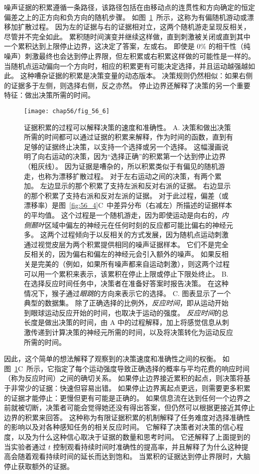 噪声证据的积累遵循一条路径，该路径包括在由移动点的连贯性和方向确定的恒定偏差之上的正方向和负方向的随机步骤。
如图~\ref{fig:56_6}~所示，这称为有偏随机游动或漂移加扩散过程。
因为左的证据与右的证据相对立，这两个随机游走呈现反相关，尽管并不完全如此。
累积随时间演变并继续这样做，直到刺激被关闭或直到其中一个累积达到上限停止边界，这决定了答案，左或右。
即使是 0\% 的相干性（纯噪声）刺激最终也会达到停止界限，但左积累或右积累这样做的可能性是一样的。
当随机点运动偏向一个方向时，相应的积累更有可能决定选择，并且运动越强越如此。
这种嘈杂证据的积累是决策变量的动态版本。
决策规则仍然相似：如果右侧的证据多于左侧，则选择右侧，反之亦然。
停止边界还解释了决策的另一个重要特征：做出决策所需的时间。


\begin{figure}[htbp]
	\centering
	\texttt{[image: chap56/fig\_56\_6]}
	\caption{证据积累的过程可以解释决策的速度和准确性。
		A. 决策和做出决策所需的时间都可以通过证据的积累来解释，作为时间的函数，直到有足够的证据终止决策，以支持一个选择或另一个选择。
		这幅漫画说明了向右运动的决策，因为“选择正确”的积累第一个达到停止边界（粗灰线）。
		因为证据是嘈杂的，所以积累类似于有偏见的随机游走，也称为漂移扩散过程。
		对于左右运动之间的决策，有两个累加。
		左边显示的那个积累了支持左派和反对右派的证据。
		右边显示的那个积累了支持右派和反对左派的证据。
		对于此过程，偏差（或漂移率）是图~\ref{fig:56_4}C~中差异分布（右减左）所描述的证据样本的平均值。
		这个过程是一个随机游走，因为即使运动是向右的，\textit{内侧颞叶}区域中偏左的神经元在任何时刻的反应都可能比偏右的神经元多。
		这两个过程倾向于以反相关的方式发展，因为随机点运动刺激通过视觉皮层为两个积累提供相同的噪声证据样本。
		它们不是完全反相关的，因为偏右和偏左的神经元会引入额外的噪声。
		如果反相关是完美的（例如，如果所有噪声都来自运动刺激），则这两个过程可以用一个累积来表示，该累积在停止上限或停止下限处终止。
		B. 在选择反应时间任务中，决策者在准备好答案时报告决策。
		在这种情况下，猴子通过\textit{眼跳}的方向来表示它的选择。
		C. 图表显示了一个典型的数据集。
		除了正确选择的比例外，\textit{反应时间}，即从运动开始到眼球运动反应开始的时间，也取决于运动的强度。
		\textit{反应时间}的总长度是做出决策的时间，由 A 中的过程解释，加上将感觉信息从刺激传递到计算决策的神经元所需的时间，以及将决策转化为运动反应所需的时间\cite{gold2007neural}。 }
	\label{fig:56_6}
\end{figure}


因此，这个简单的想法解释了观察到的决策速度和准确性之间的权衡。
如图~\ref{fig:56_6}C~所示，它指定了每个运动强度导致正确选择的概率与平均花费的响应时间（称为反应时间）之间的确切关系。
如果停止边界接近累积的起点，则决策将基于非常少的证据：快速但容易出错。
如果停止边界离起点更远，则需要更多积累的证据才能停止：更慢但更有可能是正确的。
如果信息流在达到任何一个边界之前就被切断，决策者可能会觉得她还没有得出答案，但仍然可以根据更接近其停止边界的积累来回答。
这种称为有限证据积累的机制解释了任务难度对选择准确性的影响以及对各种感知任务的相关反应时间。
它解释了决策者对决策的信心程度，以及为什么这种信心取决于证据的数量和思考时间。
它还解释了上面提到的当实验者通过 $ t $ 控制观看持续时间时准确性的提高率，并且解释了为什么这种提高会随着观看持续时间的延长而达到饱和。
当累积的证据达到停止界限时，大脑停止获取额外的证据。



